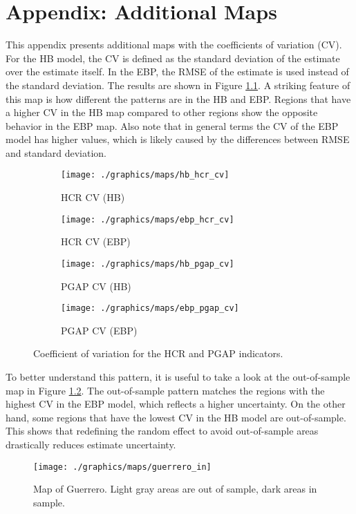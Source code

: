 \chapter{Appendix: Additional Maps}
\label{appendix:cv_maps}

This appendix presents additional maps with the coefficients of variation (CV).
For the HB model, the CV is defined as the standard deviation of the estimate over the estimate itself.
In the EBP, the RMSE of the estimate is used instead of the standard deviation.
The results are shown in Figure \ref{fig:cv_maps}.
A striking feature of this map is how different the patterns are in the HB and EBP.
Regions that have a higher CV in the HB map compared to other regions show the opposite behavior in the EBP map.
Also note that in general terms the CV of the EBP model has higher values, which is likely caused by the differences between RMSE and standard deviation.


\begin{figure}[h]
    \begin{subfigure}{0.49\linewidth}
        \centering
        \texttt{[image: ./graphics/maps/hb\_hcr\_cv]}
        \caption{HCR CV (HB)}
    \end{subfigure}
    \begin{subfigure}{0.49\linewidth}
        \centering
        \texttt{[image: ./graphics/maps/ebp\_hcr\_cv]}
        \caption{HCR CV (EBP)}
    \end{subfigure}

    \begin{subfigure}{0.49\linewidth}
        \centering
        \texttt{[image: ./graphics/maps/hb\_pgap\_cv]}
        \caption{PGAP CV (HB)}
    \end{subfigure}
    \begin{subfigure}{0.49\linewidth}
        \centering
        \texttt{[image: ./graphics/maps/ebp\_pgap\_cv]}
        \caption{PGAP CV (EBP)}
    \end{subfigure}
    \caption{Coefficient of variation for the HCR and PGAP indicators.}
    \label{fig:cv_maps}
\end{figure}

To better understand this pattern, it is useful to take a look at the out-of-sample map in Figure \ref{fig:guerrero_in}.
The out-of-sample pattern matches the regions with the highest CV in the EBP model, which reflects a higher uncertainty.
On the other hand, some regions that have the lowest CV in the HB model are out-of-sample.
This shows that redefining the random effect to avoid out-of-sample areas drastically reduces estimate uncertainty.


\begin{figure}
    \centering
    \texttt{[image: ./graphics/maps/guerrero\_in]}
       \caption[Map of Guerrero with in and out-of-sample areas]{Map of Guerrero. Light gray areas are out of sample, dark areas in sample.}
    \label{fig:guerrero_in}
\end{figure}